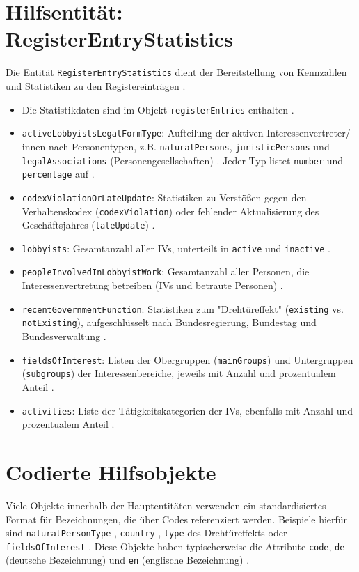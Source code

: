\documentclass[12pt,twoside=false,a4paper,parskip]{scrbook}
\begin{document}
\section{Hilfsentität: RegisterEntryStatistics}

Die Entität \texttt{RegisterEntryStatistics} dient der Bereitstellung von Kennzahlen und Statistiken zu den Registereinträgen .

\begin{itemize}
    \item Die Statistikdaten sind im Objekt \texttt{registerEntries} enthalten .
    \item \texttt{activeLobbyistsLegalFormType}: Aufteilung der aktiven Interessenvertreter/-innen nach Personentypen, z.B. \texttt{naturalPersons}, \texttt{juristicPersons} und \texttt{legalAssociations} (Personengesellschaften) . Jeder Typ listet \texttt{number} und \texttt{percentage} auf .
    \item \texttt{codexViolationOrLateUpdate}: Statistiken zu Verstößen gegen den Verhaltenskodex (\texttt{codexViolation}) oder fehlender Aktualisierung des Geschäftsjahres (\texttt{lateUpdate}) .
    \item \texttt{lobbyists}: Gesamtanzahl aller IVs, unterteilt in \texttt{active} und \texttt{inactive} .
    \item \texttt{peopleInvolvedInLobbyistWork}: Gesamtanzahl aller Personen, die Interessenvertretung betreiben (IVs und betraute Personen) .
    \item \texttt{recentGovernmentFunction}: Statistiken zum "Drehtüreffekt" (\texttt{existing} vs. \texttt{notExisting}), aufgeschlüsselt nach Bundesregierung, Bundestag und Bundesverwaltung .
    \item \texttt{fieldsOfInterest}: Listen der Obergruppen (\texttt{mainGroups}) und Untergruppen (\texttt{subgroups}) der Interessenbereiche, jeweils mit Anzahl und prozentualem Anteil .
    \item \texttt{activities}: Liste der Tätigkeitskategorien der IVs, ebenfalls mit Anzahl und prozentualem Anteil .
\end{itemize}

\section{Codierte Hilfsobjekte}
Viele Objekte innerhalb der Hauptentitäten verwenden ein standardisiertes Format für Bezeichnungen, die über Codes referenziert werden. Beispiele hierfür sind \texttt{naturalPersonType} , \texttt{country} , \texttt{type} des Drehtüreffekts  oder \texttt{fieldsOfInterest} . Diese Objekte haben typischerweise die Attribute \texttt{code}, \texttt{de} (deutsche Bezeichnung) und \texttt{en} (englische Bezeichnung) .
\end{document}
